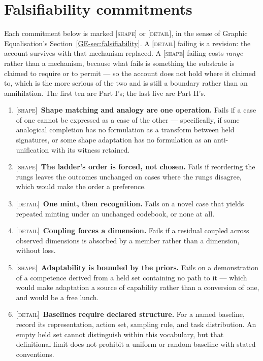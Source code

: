 \documentclass[11pt,a4paper]{article}
\theoremstyle{remark}
\begin{document}
\section{Falsifiability commitments}\label{sec:falsifiability}
Each commitment below is marked \textsc{[shape]} or \textsc{[detail]}, in the sense of Graphic
Equalisation's Section~\ref{GE-sec:falsifiability}. A \textsc{[detail]} failing is a revision: the
account survives with that mechanism replaced. A \textsc{[shape]} failing costs \emph{range} rather
than a mechanism, because what fails is something the substrate is claimed to require or to permit ---
so the account does not hold where it claimed to, which is the more serious of the two and is still a
boundary rather than an annihilation. The first ten are Part I's; the last five are Part II's.

\begin{enumerate}[leftmargin=*]
\item \textsc{[shape]}~\textbf{Shape matching and analogy are one operation.} Fails if a case of one
cannot be expressed as a case of the other --- specifically, if some analogical completion has no
formulation as a transform between held signatures, or some shape adaptation has no formulation as an
anti-unification with its witness retained.
\item \textsc{[shape]}~\textbf{The ladder's order is forced, not chosen.} Fails if reordering the rungs
leaves the outcomes unchanged on cases where the rungs disagree, which would make the order a
preference.
\item \textsc{[detail]}~\textbf{One mint, then recognition.} Fails on a novel case that yields repeated
minting under an unchanged codebook, or none at all.
\item \textsc{[detail]}~\textbf{Coupling forces a dimension.} Fails if a residual coupled across
observed dimensions is absorbed by a member rather than a dimension, without loss.
\item \textsc{[shape]}~\textbf{Adaptability is bounded by the priors.} Fails on a demonstration of a
competence derived from a held set containing no path to it --- which would make adaptation a source of
capability rather than a conversion of one, and would be a free lunch.
\item \textsc{[detail]}~\textbf{Baselines require declared structure.} For a named baseline,
record its representation, action set, sampling rule, and task distribution.
An empty held set cannot distinguish within this vocabulary, but that definitional
limit does not prohibit a uniform or random baseline with stated conventions.

\end{enumerate}
\end{document}
